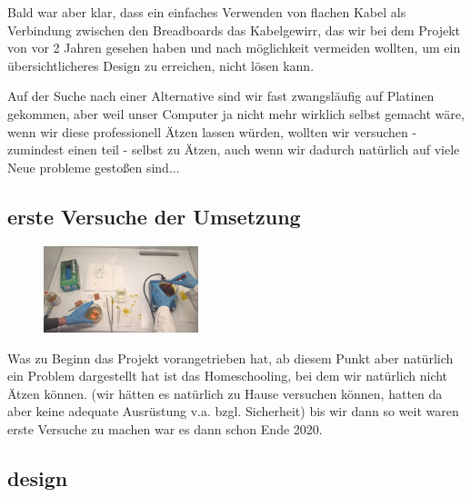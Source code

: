 \documentclass{scrartcl}
\begin{document}
    Bald war aber klar, dass ein einfaches Verwenden von flachen Kabel als Verbindung zwischen den Breadboards das Kabelgewirr, das wir bei dem Projekt von vor 2 Jahren gesehen haben
    und nach möglichkeit vermeiden wollten, um ein übersichtlicheres Design zu erreichen, nicht lösen kann.

    Auf der Suche nach einer Alternative sind wir fast zwangsläufig auf Platinen gekommen, aber weil unser Computer ja nicht mehr wirklich selbst gemacht wäre, wenn wir diese professionell Ätzen lassen würden,
    wollten wir versuchen - zumindest einen teil - selbst zu Ätzen, auch wenn wir dadurch natürlich auf viele Neue probleme gestoßen sind...




    \subsection{erste Versuche der Umsetzung}

        \begin{figure}
        \vspace{-25pt}
        \begin{center}
        \includegraphics[width=0.4\textwidth,angle=0]{Handy/WP_20210704_20_40_03_Pro} %
        \end{center}
        \vspace{-20pt}
        \end{figure}

    Was zu Beginn das Projekt vorangetrieben hat, ab diesem Punkt aber natürlich ein Problem dargestellt hat ist das Homeschooling, bei dem wir natürlich nicht Ätzen können.
    (wir hätten es natürlich zu Hause versuchen können, hatten da aber keine adequate Ausrüstung v.a. bzgl. Sicherheit)
    bis wir dann so weit waren erste Versuche zu machen war es dann schon Ende 2020.

    \newpage
    \subsection{design}
\end{document}
